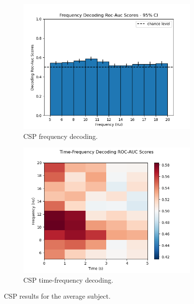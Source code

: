 \begin{figure}
    \centering
    \begin{subfigure}{.5\textwidth}
        \centering
        \includegraphics[width=1.\linewidth]{images_report/sensor/csp_permutation_res/csp_frequency.png}
        \caption{CSP frequency decoding.}
        \label{fig:csp_frequency}
    \end{subfigure}%
    \begin{subfigure}{.5\textwidth}
        \centering
        \includegraphics[width=1.\linewidth]{images_report/sensor/csp_permutation_res/csp_time_frequency.png}
        \caption{CSP time-frequency decoding.}
        \label{fig:csp_time_frequency}
    \end{subfigure}
    \caption{CSP results for the average subject.}
    \label{fig:csp_results}
\end{figure}


